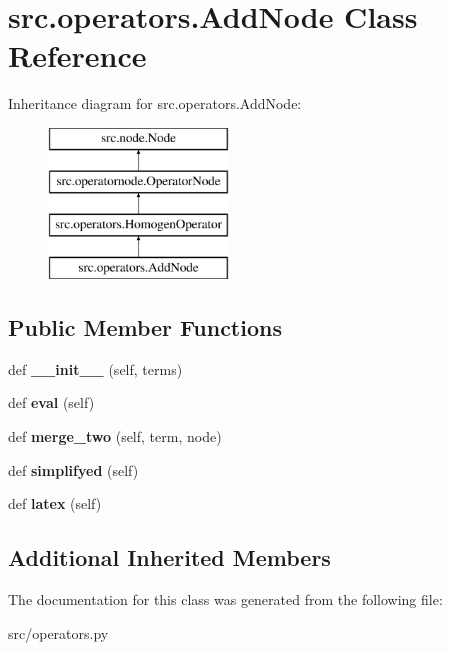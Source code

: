\hypertarget{classsrc_1_1operators_1_1AddNode}{}\section{src.\+operators.\+Add\+Node Class Reference}
\label{classsrc_1_1operators_1_1AddNode}
Inheritance diagram for src.\+operators.\+Add\+Node\+:\begin{figure}[H]
\begin{center}
\leavevmode
\includegraphics[height=4.000000cm]{classsrc_1_1operators_1_1AddNode}
\end{center}
\end{figure}
\subsection*{Public Member Functions}
\begin{DoxyCompactItemize}
\item 
\mbox{\label{classsrc_1_1operators_1_1AddNode_a5f98463a5345ae272d0d5a96193abd05}} 
def {\bfseries \+\_\+\+\_\+init\+\_\+\+\_\+} (self, terms)
\item 
\mbox{\label{classsrc_1_1operators_1_1AddNode_a9aba65294be7ca5bca93fa80f5226c9b}} 
def {\bfseries eval} (self)
\item 
\mbox{\label{classsrc_1_1operators_1_1AddNode_a6cd89d4e0a8075d51827c45db80c736a}} 
def {\bfseries merge\+\_\+two} (self, term, node)
\item 
\mbox{\label{classsrc_1_1operators_1_1AddNode_aadc2111ae48380bed5a886bdf57a7faa}} 
def {\bfseries simplifyed} (self)
\item 
\mbox{\label{classsrc_1_1operators_1_1AddNode_a28e3202028869da3f73398cf6e12356f}} 
def {\bfseries latex} (self)
\end{DoxyCompactItemize}
\subsection*{Additional Inherited Members}


The documentation for this class was generated from the following file\+:\begin{DoxyCompactItemize}
\item 
src/operators.\+py\end{DoxyCompactItemize}

